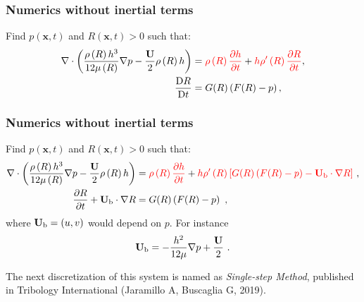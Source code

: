 \documentclass[10pt,aspectratio=169]{beamer}
\begin{document}

\begin{frame}[noframenumbering]\frametitle{Numerics without inertial terms}
Find $p(\mathbf{x},t)$ and $R(\mathbf{x},t)>0$ such that:
\begin{align*}
\nabla\cdot\left(\frac{\rho\left(R\right) h^3}{12\mu\left(R\right) }\nabla p - \frac{\mathbf{U}}{2}\rho\left(R\right) h \right)&={\color{red}\rho\left(R\right)\frac{\partial  h}{\partial t}}+{\color{red}h\rho'\left(R\right)\frac{\partial R}{\partial t}},\\
\frac{\mbox{D} R}{\mbox{D} t}&=G(R)\left(F(R)-p\right),
\end{align*}
\end{frame}


\begin{frame}[noframenumbering]\frametitle{Numerics without inertial terms}
Find $p(\mathbf{x},t)$ and $R(\mathbf{x},t)>0$ such that:
\begin{align*}
\nabla\cdot\left(\frac{\rho\left(R\right) h^3}{12\mu\left(R\right) }\nabla p -\frac{\mathbf{U}}{2}\rho\left(R\right) h\right)&={\color{red}\rho\left(R\right)\frac{\partial  h}{\partial t}}+{\color{red}h\rho'\left(R\right)\left[G(R)\left(F(R)-p\right)-\mathbf{U}_{\textnormal{\scriptsize{b}}}\cdot \nabla R\right]}~,\\
\frac{\partial R}{\partial t}+\mathbf{U}_{\textnormal{\scriptsize{b}}}\cdot \nabla R&=G(R)\left(F(R)-p\right)~,
\end{align*}
where $\mathbf{U}_{\textnormal{\scriptsize{b}}}=(u,v)$ would depend on $p$. For instance
$$\mathbf{U}_{\textnormal{\scriptsize{b}}}=-\frac{h^2}{12\mu}\nabla p+\frac{\mathbf{U}}{2}~.$$

The next discretization of this system is named as \emph{Single-step Method}, published in Tribology International (Jaramillo A, Buscaglia G, 2019).
\end{frame}

\end{document}
